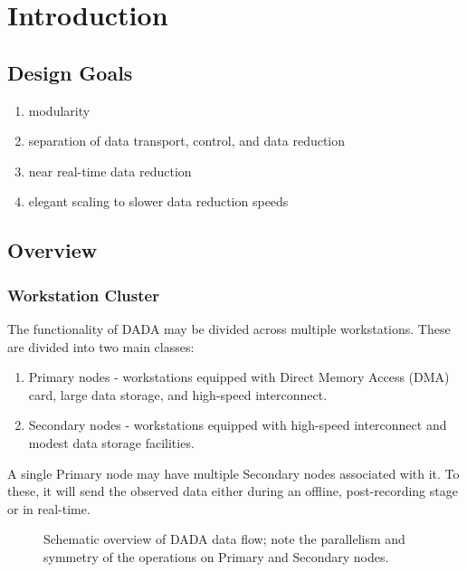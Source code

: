 
\chapter{Introduction}

\section{Design Goals}

\begin{enumerate}
\item modularity

\item separation of data transport, control, and data reduction

\item near real-time data reduction

\item elegant scaling to slower data reduction speeds
\end{enumerate}

\section{Overview}

\subsection{Workstation Cluster}

The functionality of DADA may be divided across multiple workstations.
These are divided into two main classes:

\begin{enumerate}

\item Primary nodes - workstations equipped with Direct Memory Access 
	(DMA) card, large data storage, and high-speed interconnect.

\item Secondary nodes - workstations equipped with high-speed interconnect
	and modest data storage facilities.

\end{enumerate}

A single Primary node may have multiple Secondary nodes associated
with it.  To these, it will send the observed data either during an
offline, post-recording stage or in real-time.

\begin{figure}
\centerline{}
\caption [\sffamily DADA Data Flow]
{
Schematic overview of DADA data flow; note the parallelism and 
symmetry of the operations on Primary and Secondary nodes.
}
\label{fig:layout}
\end{figure}

